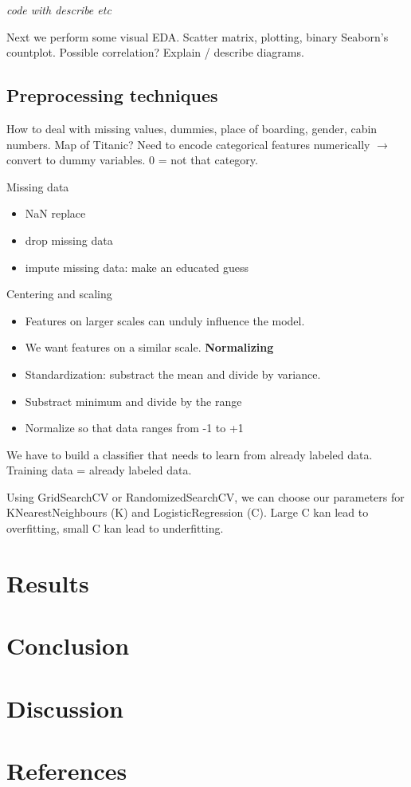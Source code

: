 \documentclass[11pt]{article}
\begin{document}
\emph{code with describe etc} 

Next we perform some visual EDA. Scatter matrix, plotting, binary Seaborn's countplot. Possible correlation? Explain / describe diagrams. 

\subsection{Preprocessing techniques}
\label{sec:org6afc283}

How to deal with missing values, dummies, place of boarding, gender, cabin numbers. Map of Titanic? Need to encode categorical features numerically \(\rightarrow\) convert to dummy variables. 0 = not that category. 

Missing data
\begin{itemize}
\item NaN replace
\item drop missing data
\item impute missing data: make an educated guess
\end{itemize}

Centering and scaling
\begin{itemize}
\item Features on larger scales can unduly influence the model.
\item We want features on a similar scale. \textbf{Normalizing}
\item Standardization: substract the mean and divide by variance.
\item Substract minimum and divide by the range
\item Normalize so that data ranges from -1 to +1
\end{itemize}



We have to build a classifier that needs to learn from already labeled data. Training data = already labeled data.


Using GridSearchCV or RandomizedSearchCV, we can choose our parameters for KNearestNeighbours (K) and LogisticRegression (C). Large C kan lead to overfitting, small C kan lead to underfitting. 
\section{Results}
\label{sec:orgc77b127}


\section{Conclusion}
\label{sec:org8c739b8}

\section{Discussion}
\label{sec:org614fa05}

\section{References}
\label{sec:orgaf0116e}

\printbibliography
\end{document}
